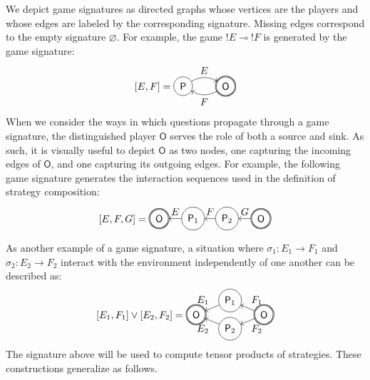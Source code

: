 \documentclass[sigplan,screen]{acmart}
\newcommand{\kw}[1]{\ensuremath{ \mathsf{#1} }}
\begin{document}
We depict game signatures as directed graphs
whose vertices are the players and
whose edges are labeled by the corresponding signature.
Missing edges correspond to the empty signature $\varnothing$.
For example,
the game ${!E} \multimap {!F}$ is generated by
the game signature:
\[
  [E,F] =
  \begin{tikzpicture}[baseline=(O.base),scale=1.5]
    \node[circle,draw,double] (O) at (0,0) {$\kw{O}$};
    \node[circle,draw] (P) at (-1,0) {$\kw{P}$};
    \path[->] (P) edge[bend left] node[above] {$E$} (O);
    \path[->] (O) edge[bend left] node[below] {$F$} (P);
  \end{tikzpicture}
\]
When we consider the ways in which questions propagate
through a game signature, %
the distinguished player $\kw{O}$ serves the role
of both a source and sink.
As such, it is visually useful
to depict $\kw{O}$ as two nodes,
one capturing the incoming edges of $\kw{O}$, and
one capturing its outgoing edges.
For example,
the following game signature
generates the interaction sequences
used in the definition of
strategy composition:
\[
  [E,F,G] =
  \begin{tikzpicture}[baseline=(O1.base),scale=1.2]
    \node[circle,double,draw] (O1) at (0,0) {$\kw{O}$};
    \node[circle,draw] (P1) at (-1,0) {$\kw{P}_2$};
    \node[circle,draw] (P2) at (-2,0) {$\kw{P}_1$};
    \node[circle,double,draw] (O2) at (-3,0) {$\kw{O}$};
    \path[->] (O1) edge node[above] {$G$} (P1);
    \path[->] (P1) edge node[above] {$F$} (P2);
    \path[->] (P2) edge node[above] {$E$} (O2);
  \end{tikzpicture}
\]

As another example of a game signature,
a situation where
$\sigma_1 : E_1 \rightarrow F_1$ and
$\sigma_2 : E_2 \rightarrow F_2$
interact with the environment
independently of one another
can be described as:
\[
  [E_1,F_1] \vee [E_2,F_2] =
  \begin{tikzpicture}[baseline=(O.base),xscale=1.2]
    \node[circle,draw,double] (O1) at (+1,0) {$\kw{O}$};
    \node[circle,draw,double] (O2) at (-1,0) {$\kw{O}$};
    \node[circle,draw] (P1) at (0,+0.5) {$\kw{P}_1$};
    \node[circle,draw] (P2) at (0,-0.5) {$\kw{P}_2$};
    \path[->] (O1) edge node[auto=right] {$F_1$} (P1);
    \path[->] (P1) edge node[auto=right] {$E_1$} (O2);
    \path[->] (O1) edge node[auto=left] {$F_2$} (P2);
    \path[->] (P2) edge node[auto=left] {$E_2$} (O2);
  \end{tikzpicture}
\]
The signature above will be used to compute
tensor products of strategies.
These constructions generalize as follows.
\end{document}

